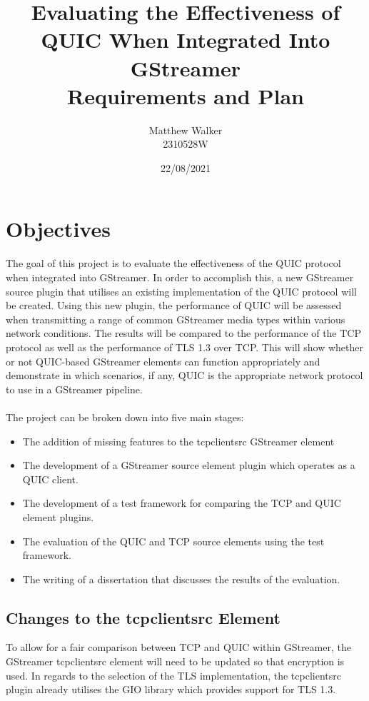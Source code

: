 \documentclass[11pt]{article}
\title{
    Evaluating the Effectiveness of QUIC When Integrated Into GStreamer \\
  Requirements and Plan}
\author{Matthew Walker \\ 2310528W}
\date{22/08/2021}
\begin{document}
\maketitle

\section{Objectives} 

The goal of this project is to evaluate the effectiveness of the QUIC protocol when integrated into GStreamer. In order to accomplish this, a new GStreamer source plugin that utilises an existing implementation of the QUIC protocol will be created. Using this new plugin, the performance of QUIC will be assessed when transmitting a range of common GStreamer media types within various network conditions. The results will be compared to the performance of the TCP protocol as well as the performance of TLS 1.3 over TCP. This will show whether or not QUIC-based GStreamer elements can function appropriately and demonstrate in which scenarios, if any, QUIC is the appropriate network protocol to use in a GStreamer pipeline.
\\\\
The project can be broken down into five main stages:

\begin{itemize}
    \item The addition of missing features to the tcpclientsrc GStreamer element
    \item The development of a GStreamer source element plugin which operates as a QUIC client.
    \item The development of a test framework for comparing the TCP and QUIC element plugins.
    \item The evaluation of the QUIC and TCP source elements using the test framework.
    \item The writing of a dissertation that discusses the results of the evaluation.
\end{itemize}

\subsection{Changes to the tcpclientsrc Element}

To allow for a fair comparison between TCP and QUIC within GStreamer, the GStreamer tcpclientsrc element will need to be updated so that encryption is used. In regards to the selection of the TLS implementation, the tcpclientsrc plugin already utilises the GIO library which provides support for TLS 1.3.
\end{document}
